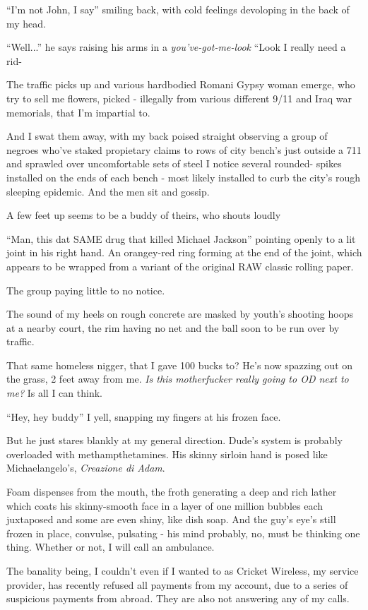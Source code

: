 \documentclass[19pt,openany]{book}
\begin{document}
``I'm not John, I say'' smiling back, with cold feelings
devoloping in the back of my head.

``Well...'' he says raising his arms in a \textit{you've-got-me-look}
``Look I really need a rid-

The traffic picks up and
various hardbodied Romani
Gypsy woman emerge, who try
to sell me flowers,
picked - illegally from
various different
9/11 and Iraq war memorials, that I'm impartial to.

And I swat them away,
with my back poised straight
observing a group of negroes
who've staked
propietary claims
to rows of city bench's
just outside a 711
and sprawled over uncomfortable sets
of steel I notice several rounded-
spikes installed on the ends of
each bench - most likely
installed to curb the city's
rough sleeping epidemic. And
the men sit and gossip.

A few feet up seems to be a buddy
of theirs,
who shouts loudly

``Man,
this dat SAME drug that killed Michael
Jackson'' pointing openly
to a lit joint in his right hand. An orangey-red ring forming at the end of the joint,
which appears to be wrapped from a
variant of the original RAW classic
rolling paper.

The group paying little to no notice.

The sound of my heels on rough concrete are masked by
youth's shooting hoops at
a nearby court, the rim having no net and
the ball soon to be run over by traffic.

That same homeless nigger,
that I gave 100 bucks
to? He's now spazzing out on the grass, 2
feet away from me. \textit{Is
this motherfucker really going
to OD next to me?} Is all
I can think.

``Hey, hey buddy'' I yell,
snapping my fingers at his
frozen face.

But he just stares blankly at
my general direction.
Dude's system is probably
overloaded with methampthetamines. His skinny
sirloin
hand is posed like Michaelangelo's, \textit{Creazione di Adam}.

Foam dispenses
from the mouth, the froth generating
a deep and rich lather which
coats his skinny-smooth face in a layer of
one million bubbles each juxtaposed and some are
even shiny, like dish soap. And the guy's eye's
still frozen in place, convulse, pulsating - his mind
probably, no, must be thinking one thing. Whether or not,
I will call an ambulance.

The banality being, I couldn't
even if I wanted to as Cricket Wireless, my service provider,
has recently refused all payments from my account, due to
a series of suspicious payments from abroad. They
are also not answering any of my calls.
\end{document}
